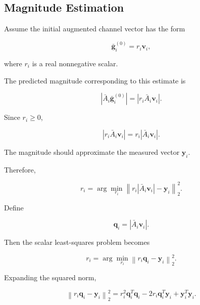 \documentclass[12pt,a4paper]{article}
\begin{document}
\subsection{Magnitude Estimation}

Assume the initial augmented channel vector has the form

\begin{equation}
\boxed{
\bar{\mathbf g}_i^{(0)}
=
r_i\mathbf v_i
},
\tag{268}
\end{equation}

where $r_i$ is a real nonnegative scalar.

The predicted magnitude corresponding to this estimate is

\begin{equation}
\left|
\bar A_i\bar{\mathbf g}_i^{(0)}
\right|
=
\left|
r_i\bar A_i\mathbf v_i
\right|.
\tag{269}
\end{equation}

Since $r_i\geq0$,

\begin{equation}
\left|
r_i\bar A_i\mathbf v_i
\right|
=
r_i
\left|
\bar A_i\mathbf v_i
\right|.
\tag{270}
\end{equation}

The magnitude should approximate the measured vector $\mathbf y_i$.

Therefore,

\begin{equation}
\boxed{
r_i
=
\arg\min_{r_i}
\left\|
r_i
\left|
\bar A_i\mathbf v_i
\right|
-
\mathbf y_i
\right\|_2^2
}.
\tag{271}
\end{equation}

Define

\begin{equation}
\mathbf q_i
=
\left|
\bar A_i\mathbf v_i
\right|.
\tag{272}
\end{equation}

Then the scalar least-squares problem becomes

\begin{equation}
r_i
=
\arg\min_{r_i}
\left\|
r_i\mathbf q_i-\mathbf y_i
\right\|_2^2.
\tag{273}
\end{equation}

Expanding the squared norm,

\begin{equation}
\left\|
r_i\mathbf q_i-\mathbf y_i
\right\|_2^2
=
r_i^2\mathbf q_i^T\mathbf q_i
-
2r_i\mathbf q_i^T\mathbf y_i
+
\mathbf y_i^T\mathbf y_i.
\tag{274}
\end{equation}
\end{document}
